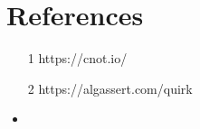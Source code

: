 \section{References}


\begin{itemize}

    
    \item [1] https://cnot.io/
    \item [2] https://algassert.com/quirk
\end{itemize}


\begin{itemize}
    \item
\end{itemize}
